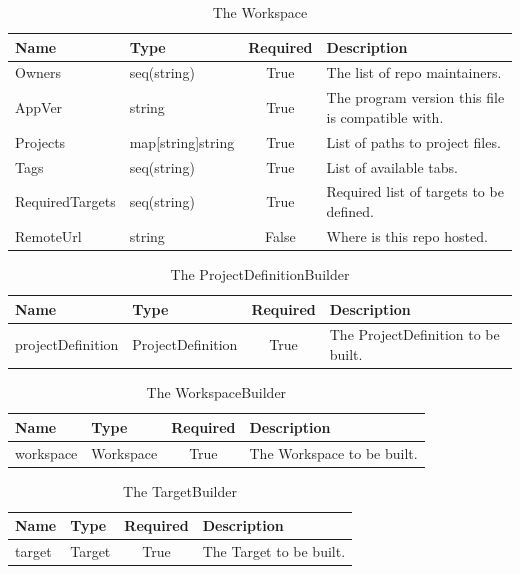 \documentclass[11pt]{article}
\begin{document}
\begin{table}[h!]
  \centering
  \begin{tabular}[h!]{l | l | c | l}
    \textbf{Name} & \textbf{Type} & \textbf{Required} & \textbf{Description}\\
    \hline
    Owners & seq(string) & True & The list of repo maintainers.\\
    \hline
    AppVer & string & True & The program version this file is compatible with.\\
    \hline
    Projects & map[string]string & True & List of paths to project files.\\
    \hline
    Tags & seq(string) & True & List of available tabs.\\
    \hline
    RequiredTargets & seq(string) & True & Required list of targets to be
                                           defined.\\
    \hline
    RemoteUrl & string & False & Where is this repo hosted.
  \end{tabular}
  \caption{The Workspace}
  \label{table:workspace}
\end{table}

\begin{table}[h!]
  \centering
  \begin{tabular}[h!]{l | l | c | l}
    \textbf{Name} & \textbf{Type} & \textbf{Required} & \textbf{Description}\\
    \hline
    projectDefinition & ProjectDefinition & True & The ProjectDefinition to be built.\\
  \end{tabular}
  \caption{The ProjectDefinitionBuilder}
  \label{table:projectDefBuilder}
\end{table}

\begin{table}[h!]
  \centering
  \begin{tabular}[h!]{l | l | c | l}
    \textbf{Name} & \textbf{Type} & \textbf{Required} & \textbf{Description}\\
    \hline
    workspace & Workspace & True & The Workspace to be built.\\
  \end{tabular}
  \caption{The WorkspaceBuilder}
  \label{table:WorkspaceBuilder}
\end{table}

\begin{table}[h!]
  \centering
  \begin{tabular}[h!]{l | l | c | l}
    \textbf{Name} & \textbf{Type} & \textbf{Required} & \textbf{Description}\\
    \hline
    target & Target & True & The Target to be built.\\
  \end{tabular}
  \caption{The TargetBuilder}
  \label{table:targetBuilder}
\end{table}
\end{document}
